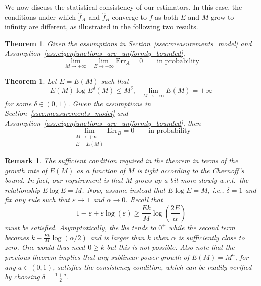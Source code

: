 \documentclass[10pt,twocolumn,twoside]{IEEEtran}					%
\newcounter{generalCounter}
\theoremstyle	{plain}
\newtheorem		{theorem}		[generalCounter]	{Theorem}
\newtheorem		{remark}		[generalCounter]	{Remark}
\newcommand	{\Assumption}			[0]	{Assumption}
\newcommand	{\Section}				[0]	{Section}
\begin{document}
We now discuss the statistical consistency of our estimators.
In this case, the conditions under which $\widehat{f}_{A}$ and $\widehat{f}_{B}$ converge to $f$ as both $E$ and $M$ grow to infinity
are different, as illustrated in the following two results. 
%
\begin{theorem}
	Given the assumptions in \Section~\ref{ssec:measurements_model} and \Assumption~\ref{ass:eigenfunctions_are_uniformly_bounded},
	\begin{equation}
		\lim_{M \rightarrow +\infty} \ \ \lim_{E \rightarrow +\infty}
		\mathrm{Err}_{A} 
		=
		0
		\qquad
		\text{in probability}
	\label{equ:f_A_is_consistent}
	\end{equation} 
	\label{thm:f_A_consistent}
\end{theorem}
%
\begin{theorem}
	Let $E=E(M)$ such that
	\begin{equation}
		E(M) \log E^\delta(M)
		\leq M^\delta, \ \ \ \lim_{M\to +\infty} E(M)=+\infty
		\label{equ:implicit_E_for_consistency_first_version}
	\end{equation}
	for some $\delta\in(0,1)$. Given the assumptions in \Section~\ref{ssec:measurements_model} and \Assumption~\ref{ass:eigenfunctions_are_uniformly_bounded}, then	
	\begin{equation}
		\lim_{\scriptscriptstyle
				\begin{array}{c}
					M \rightarrow +\infty \\
					E = E(M)
				\end{array}}
		\mathrm{Err}_{B} 
		=
		0
		\qquad
		\text{in probability}
		\label{equ:f_B_is_consistent}
	\end{equation} 
	\label{thm:f_A_and_f_B_are_consistent}
\end{theorem}
%
\begin{remark}
The sufficient condition required in the theorem in terms of the growth rate of $E(M)$ as a function of $M$ is tight according to the Chernoff's bound. In fact, our requirement is that $M$ grows up a bit more slowly w.r.t.\ the relationship $E \log E=M$. Now, assume instead that $E \log E=M$, i.e., $\delta=1$ and fix any rule such that $\varepsilon \rightarrow 1$ and $\alpha \rightarrow 0$. Recall that 
$$
1 - \varepsilon + \varepsilon \log(\varepsilon)
		\geq
		\frac{Ek}{M} \log\left(\frac{2 E}{\alpha}\right)
$$
	must be satisfied. Asymptotically, the lhs tends to $0^+$ while the second term becomes $k-\frac{Ek}{M} \log(\alpha/2)$ and is larger than $k$ when $\alpha$ is sufficiently close to zero. One would thus need $0 \geq k$ but this is not possible. Also note that the previous theorem implies that any sublinear power growth of $E(M)=M^a$, for any $a\in(0,1)$, satisfies the consistency condition, which can be readily verified by choosing $\delta=\frac{1+a}{2}$. %
\end{remark}
\end{document}
